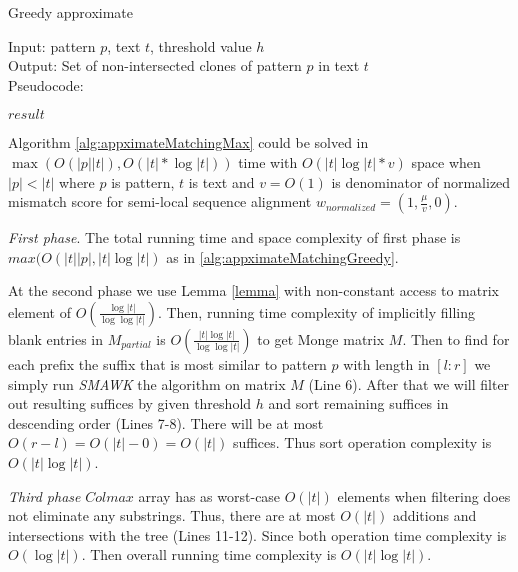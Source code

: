 \begin{algorithm}[H]
\caption{Greedy approximate}
\label{alg:appximateMatchingMax}
Input: pattern $p$, text $t$, threshold value $h$\\
Output: Set of non-intersected clones of pattern $p$ in text $t$\\
Pseudocode:
\begin{algorithmic}[1]

\ENDIF
\ENDFOR
{}
\RETURN $result$
\end{algorithmic}
\end{algorithm}

\begin{theorem}
Algorithm \ref{alg:appximateMatchingMax} could  be solved in
$\max (O(|p||t|), O(|t|* \log |t|))$ time with $O(|t|  \log {|t| * v })$ space when $|p|<|t|$ where $p$ is pattern, $t$ is text and $v=O(1)$ is denominator of normalized mismatch score for semi-local sequence alignment
$w_{normalized} = (1,\frac{\mu}{v},0)$.
\end{theorem}

\emph{First phase}.
The total running time and space complexity of first phase is 
$max(O(|t||p|, |t| \log |t|)$ as in \ref{alg:appximateMatchingGreedy}.


At the second phase we use Lemma \ref{lemma} with non-constant access to matrix element of $O(\frac{\log |t|}{\log \log |t|})$.
Then, running time complexity of implicitly filling
blank entries in $M_{partial}$ is 
$O(\frac{|t| \log |t|}{\log \log |t|})$ to get Monge matrix $M$.
Then to find for each prefix the suffix that is most similar to pattern $p$ with length in $[l:r]$ we simply run \emph{SMAWK}
the algorithm on matrix $M$ (Line 6).
After that we will filter out resulting suffices by given threshold $h$ and sort remaining suffices in descending order (Lines 7-8).
There will be at most $O(r-l)=O(|t| - 0) = O(|t|)$ suffices.
Thus sort operation complexity  is $O(|t| \log |t|)$.

\emph{Third phase}
$Colmax$ array has as worst-case $O(|t|)$ elements when filtering does not eliminate any substrings.
Thus, 
there are at most $O(|t|)$ additions and intersections with the tree (Lines 11-12).
Since both operation time complexity is  $O(\log |t|)$.
Then overall running time complexity is $O(|t|\log |t|)$.

